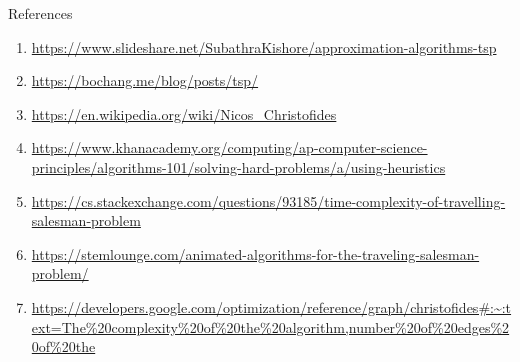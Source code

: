 \documentclass[12pt]{beamer}
\begin{document}
\begin{frame}{References}
    \begin{enumerate}
        \item \url{https://www.slideshare.net/SubathraKishore/approximation-algorithms-tsp}
        \item
        \url{https://bochang.me/blog/posts/tsp/}
        \item 
        \url{https://en.wikipedia.org/wiki/Nicos_Christofides}
        \item \url{https://www.khanacademy.org/computing/ap-computer-science-principles/algorithms-101/solving-hard-problems/a/using-heuristics}
        \item \url{https://cs.stackexchange.com/questions/93185/time-complexity-of-travelling-salesman-problem}
        \item \url{https://stemlounge.com/animated-algorithms-for-the-traveling-salesman-problem/}
        \item     \url{https://developers.google.com/optimization/reference/graph/christofides\#:~:text=The\%20complexity\%20of\%20the\%20algorithm,number\%20of\%20edges\%20of\%20the}
    \end{enumerate}
\end{frame}
\end{document}

